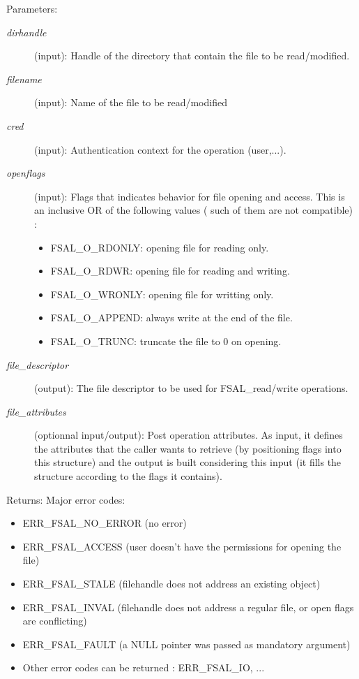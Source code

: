 \begin{Desc}
\item[Parameters:]
\begin{description}
\item[{\em dirhandle}](input): Handle of the directory that contain the file to be read/modified. \item[{\em filename}](input): Name of the file to be read/modified \item[{\em cred}](input): Authentication context for the operation (user,...). \item[{\em openflags}](input): Flags that indicates behavior for file opening and access. This is an inclusive OR of the following values ( such of them are not compatible) :\begin{itemize}
\item FSAL\_\-O\_\-RDONLY: opening file for reading only.\item FSAL\_\-O\_\-RDWR: opening file for reading and writing.\item FSAL\_\-O\_\-WRONLY: opening file for writting only.\item FSAL\_\-O\_\-APPEND: always write at the end of the file.\item FSAL\_\-O\_\-TRUNC: truncate the file to 0 on opening. \end{itemize}
\item[{\em file\_\-descriptor}](output): The file descriptor to be used for FSAL\_\-read/write operations. \item[{\em file\_\-attributes}](optionnal input/output): Post operation attributes. As input, it defines the attributes that the caller wants to retrieve (by positioning flags into this structure) and the output is built considering this input (it fills the structure according to the flags it contains).\end{description}
\end{Desc}
\begin{Desc}
\item[Returns:]Major error codes:\begin{itemize}
\item ERR\_\-FSAL\_\-NO\_\-ERROR (no error)\item ERR\_\-FSAL\_\-ACCESS (user doesn't have the permissions for opening the file)\item ERR\_\-FSAL\_\-STALE (filehandle does not address an existing object)\item ERR\_\-FSAL\_\-INVAL (filehandle does not address a regular file, or open flags are conflicting)\item ERR\_\-FSAL\_\-FAULT (a NULL pointer was passed as mandatory argument)\item Other error codes can be returned : ERR\_\-FSAL\_\-IO, ... \end{itemize}
\end{Desc}


